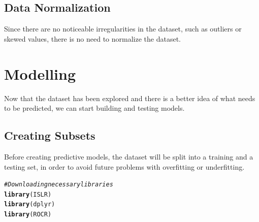 \documentclass[a4paper,12pt]{article}\usepackage[]{graphicx}\usepackage[]{color}
\makeatletter
\newcommand{\hlcom}[1]{\textcolor[rgb]{0.678,0.584,0.686}{\textit{#1}}}%
\newcommand{\hlstd}[1]{\textcolor[rgb]{0.345,0.345,0.345}{#1}}%
\newcommand{\hlkwd}[1]{\textcolor[rgb]{0.737,0.353,0.396}{\textbf{#1}}}%
\newenvironment{kframe}{%
 \def\at@end@of@kframe{}%
 \ifinner\ifhmode%
  \def\at@end@of@kframe{\end{minipage}}%
  \begin{minipage}{\columnwidth}%
 \fi\fi%
 \def\FrameCommand##1{\hskip\@totalleftmargin \hskip-\fboxsep
 \colorbox{shadecolor}{##1}\hskip-\fboxsep
     \hskip-\linewidth \hskip-\@totalleftmargin \hskip\columnwidth}%
 \MakeFramed {\advance\hsize-\width
   \@totalleftmargin\z@ \linewidth\hsize
   \@setminipage}}%
 {\par\unskip\endMakeFramed%
 \at@end@of@kframe}
\newenvironment{knitrout}{}{} %
\makeatother
\begin{document}
\subsection{Data Normalization}\label{data_normalization}
Since there are no noticeable irregularities in the dataset, such as outliers or skewed values, there is no need to normalize the dataset.

\clearpage


\section{Modelling}\label{modelling}
Now that the dataset has been explored and there is a better idea of what needs to be predicted, we can start building and testing models.

\subsection{Creating Subsets}\label{subsets}
Before creating predictive models, the dataset will be split into a training and a testing set, in order to avoid future problems with overfitting or underfitting.

\begin{knitrout}
\color{fgcolor}\begin{kframe}
\begin{alltt}
\hlcom{# Downloading necessary libraries}
\hlkwd{library}\hlstd{(ISLR)}
\hlkwd{library}\hlstd{(dplyr)}
\hlkwd{library}\hlstd{(ROCR)}
\end{alltt}
\end{kframe}
\end{knitrout}
\end{document}
